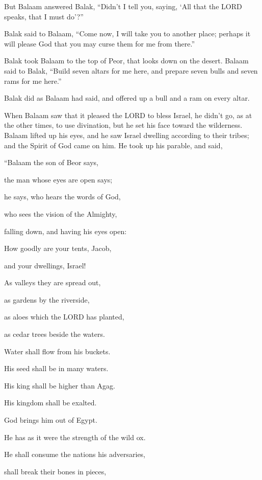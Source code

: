 \myverse{}But Balaam answered Balak, “Didn’t I tell you, saying, ‘All
that the LORD speaks, that I must do’?”


\myverse{}Balak said to Balaam, “Come now, I will take you to another
place; perhaps it will please God that you may curse them for me from there.”


\myverse{}Balak took Balaam to the top of Peor, that looks down on the
desert.
\myverse{}Balaam said to Balak, “Build seven altars for me here, and prepare seven
bulls and seven rams for me here.”


\myverse{}Balak did as Balaam had said, and offered up a bull and a ram
on every altar.


\mychapter{} \myverse*{}When Balaam saw that it pleased the LORD to bless Israel, he didn’t
go, as at the other times, to use divination, but he set his face toward the wilderness.
\myverse{}Balaam lifted up his eyes, and he saw Israel dwelling according to their tribes;
and the Spirit of God came on him.
\myverse{}He took up his parable, and said,

“Balaam the son of Beor says,

the man whose eyes are open says;


\myverse{}he says, who hears the words of God,

who sees the vision of the Almighty,

falling down, and having his eyes open:


\myverse{}How goodly are your tents, Jacob,

and your dwellings, Israel!


\myverse{}As valleys they are spread out,

as gardens by the riverside,

as aloes which the LORD has planted,

as cedar trees beside the waters.


\myverse{}Water shall flow from his buckets.

His seed shall be in many waters.

His king shall be higher than Agag.

His kingdom shall be exalted.


\myverse{}God brings him out of Egypt.

He has as it were the strength of the wild ox.

He shall consume the nations his adversaries,

shall break their bones in pieces,


